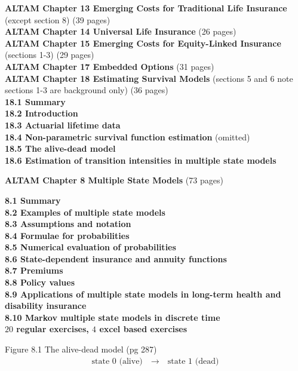 \documentclass[hidelinks, 12pt]{article}
\theoremstyle{mydefstyle}
\theoremstyle{mythmstyle}
\begin{document}
\textbf{ALTAM Chapter 13 Emerging Costs for Traditional Life Insurance} (except section 8) (39 pages) \\

\textbf{ALTAM Chapter 14 Universal Life Insurance} (26 pages) \\

\textbf{ALTAM Chapter 15 Emerging Costs for Equity-Linked Insurance} (sections 1-3) (29 pages) \\

\textbf{ALTAM Chapter 17 Embedded Options} (31 pages) \\

\textbf{ALTAM Chapter 18 Estimating Survival Models} (sections 5 and 6 note sections 1-3 are background only) (36 pages) \\
\textbf{18.1 Summary} \\
\textbf{18.2 Introduction} \\
\textbf{18.3 Actuarial lifetime data} \\
\textbf{18.4 Non-parametric survival function estimation} (omitted) \\
\textbf{18.5 The alive-dead model} \\
\textbf{18.6 Estimation of transition intensities in multiple state models} 

\newpage

\begin{center}
\textbf{ALTAM Chapter 8 Multiple State Models} (73 pages)
\end{center}

\textbf{8.1 Summary} \\
\textbf{8.2 Examples of multiple state models} \\
\textbf{8.3 Assumptions and notation} \\
\textbf{8.4 Formulae for probabilities} \\
\textbf{8.5 Numerical evaluation of probabilities} \\
\textbf{8.6 State-dependent insurance and annuity functions} \\
\textbf{8.7 Premiums} \\
\textbf{8.8 Policy values} \\
\textbf{8.9 Applications of multiple state models in long-term health and disability insurance} \\
\textbf{8.10 Markov multiple state models in discrete time} \\
\textbf{$20$ regular exercises, $4$ excel based exercises}

Figure 8.1 The alive-dead model (pg 287)
\begin{gather*}
\mbox{state 0 (alive)} \quad\longrightarrow\quad \mbox{state 1 (dead)}
\end{gather*}
\end{document}
